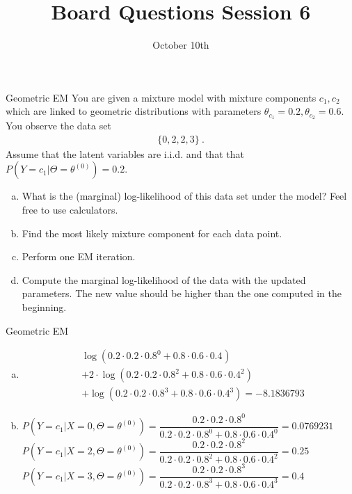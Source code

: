 \documentclass{beamer}\usepackage[]{graphicx}\usepackage[]{color}
\title{Board Questions Session 6}
\date{October 10th}
\begin{document}
\begin{frame}{Geometric EM}
\small
You are given a mixture model with mixture components $ c_{1},c_{2} $ which are linked to geometric
distributions with parameters $ \theta_{c_{1}} = 0.2, \theta_{c_{2}} = 0.6 $. You
observe the data set
\begin{align*}
\{0, 2, 2, 3\} \ .
\end{align*}
Assume that the latent variables are i.i.d. and that that $ P(Y=c_{1}|\Theta=\theta^{(0)}) = 0.2 $.
\begin{enumerate}[a)]
\item What is the (marginal) log-likelihood of this data set under the model? Feel free to use
calculators.
\item Find the most likely mixture component for each data point.
\item Perform one EM iteration.
\item Compute the marginal log-likelihood of the data with the updated parameters. The new value
should be higher than the one computed in the beginning.
\end{enumerate}
\end{frame}

\begin{frame}{Geometric EM}
\small
\begin{enumerate}[a)]
\item \begin{align*}
&\log(0.2\cdot 0.2\cdot 0.8^{0} + 0.8 \cdot 0.6 \cdot 0.4^{}) \\
&+ 2\cdot \log(0.2\cdot 0.2 \cdot 0.8^{2} + 0.8\cdot 0.6 \cdot 0.4^{2}) \\
&+ \log(0.2\cdot 0.2 \cdot 0.8^{3} + 0.8\cdot 0.6 \cdot 0.4^{3})
= \ensuremath{-8.1836793}
\end{align*}
\item $ P(Y = c_{1}|X=0, \Theta=\theta^{(0)}) = \dfrac{0.2\cdot 0.2\cdot 0.8^{0}}{0.2\cdot 0.2\cdot 0.8^{0} + 0.8 \cdot 0.6 \cdot 0.4^{0}} = 0.0769231 $
\\ \vspace{.4cm}
$ P(Y = c_{1}|X=2, \Theta=\theta^{(0)}) = \dfrac{0.2\cdot 0.2\cdot 0.8^{2}}{0.2\cdot 0.2\cdot 0.8^{2} + 0.8 \cdot 0.6 \cdot 0.4^{2}} = 0.25 $
\\ \vspace{.4cm}
$ P(Y = c_{1}|X=3, \Theta=\theta^{(0)}) = \dfrac{0.2\cdot 0.2\cdot 0.8^{3}}{0.2\cdot 0.2\cdot 0.8^{3} + 0.8 \cdot 0.6 \cdot 0.4^{3}} = 0.4 $
\end{enumerate}
\end{frame}
\end{document}
